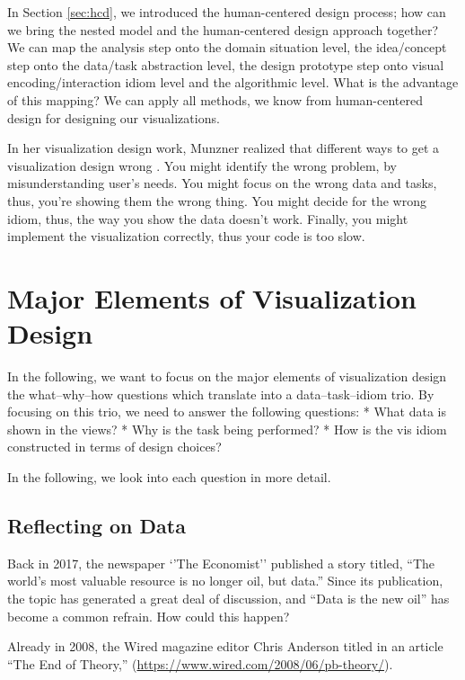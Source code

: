 \documentclass[
]{book}
\begin{document}
In Section \ref{sec:hcd}, we introduced the human-centered design process; how can we bring the nested model and the human-centered design approach together? We can map the analysis step onto the domain situation level, the idea/concept step onto the data/task abstraction level, the design prototype step onto visual encoding/interaction idiom level and the algorithmic level. What is the advantage of this mapping? We can apply all methods, we know from human-centered design for designing our visualizations.

In her visualization design work, Munzner realized that different ways to get a visualization design wrong \citep{munzner2014visualization}. You might identify the wrong problem, by misunderstanding user's needs. You might focus on the wrong data and tasks, thus, you're showing them the wrong thing. You might decide for the wrong idiom, thus, the way you show the data doesn't work. Finally, you might implement the visualization correctly, thus your code is too slow.

\hypertarget{major-elements-of-visualization-design}{%
\section{Major Elements of Visualization Design}\label{major-elements-of-visualization-design}}

In the following, we want to focus on the major elements of visualization design the what--why--how questions which translate into a data--task--idiom trio. By focusing on this trio, we need to answer the following questions:
* What data is shown in the views?
* Why is the task being performed?
* How is the vis idiom constructed in terms of design choices?

In the following, we look into each question in more detail.

\hypertarget{reflecting-on-data}{%
\subsection{Reflecting on Data}\label{reflecting-on-data}}

Back in 2017, the newspaper `'The Economist'' published a story titled, ``The world's most valuable resource is no longer oil, but data.'' Since its publication, the topic has generated a great deal of discussion, and ``Data is the new oil'' has become a common refrain. How could this happen?

Already in 2008, the Wired magazine editor Chris Anderson titled in an article ``The End of Theory,'' (\url{https://www.wired.com/2008/06/pb-theory/}).
\end{document}
